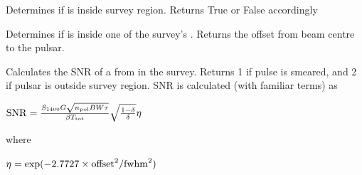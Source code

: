\documentclass[letterpaper,10pt,english]{sphinxmanual}
\begin{document}
\begin{fulllineitems}
\label{\detokenize{module-level-docs:survey.Survey.inRegion}}
\pysigstartsignatures
\pysiglinewithargsret
{}
{}
{}
\pysigstopsignatures
\sphinxAtStartPar
Determines if {\hyperref[\detokenize{module-level-docs:pulsar.Pulsar}]{}} is inside survey region. Returns True or False accordingly

\end{fulllineitems}


\begin{fulllineitems}
\label{\detokenize{module-level-docs:survey.Survey.inPointing}}
\pysigstartsignatures
\pysiglinewithargsret
{}
{}
{}
\pysigstopsignatures
\sphinxAtStartPar
Determines if {\hyperref[\detokenize{module-level-docs:pulsar.Pulsar}]{}} is inside one of the survey’s {\hyperref[\detokenize{module-level-docs:survey.Pointing}]{}}. Returns the offset from beam centre to the pulsar.

\end{fulllineitems}


\begin{fulllineitems}
\label{\detokenize{module-level-docs:survey.Survey.SNRcalc}}
\pysigstartsignatures
\pysiglinewithargsret
{}
{\sphinxparamcomma {}}
{}
\pysigstopsignatures
\sphinxAtStartPar
Calculates the SNR of a {\hyperref[\detokenize{module-level-docs:pulsar.Pulsar}]{}} from {\hyperref[\detokenize{module-level-docs:population.Population}]{}}  in the survey. Returns \sphinxhyphen{}1 if pulse is smeared, and \sphinxhyphen{}2 if pulsar is outside survey region. SNR is calculated (with familiar terms) as

\sphinxAtStartPar
\({\rm{SNR}} = \frac{S_{1400} G \sqrt{n_{\rm{pol}} BW \tau}}{\beta T_{\rm{tot}}} \sqrt{\frac{1-\delta}{\delta}} \eta\)

\sphinxAtStartPar
where

\sphinxAtStartPar
\(\eta = \exp(-2.7727 \times {\rm{offset}}^2 / {\rm{fwhm}}^2)\)

\end{fulllineitems}
\end{document}
